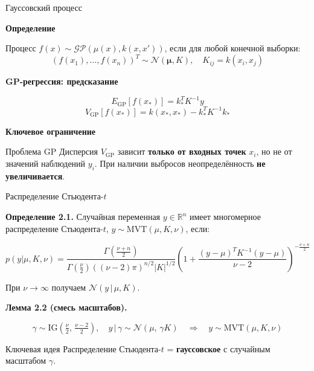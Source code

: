 \documentclass{beamer}
\begin{document}
\begin{frame}{Гауссовский процесс}

{\small
\textbf{Определение}

Процесс $f(x) \sim \mathcal{GP}(\mu(x), k(x,x'))$, если для любой конечной выборки:
\[
    (f(x_1), \ldots, f(x_n))^T \sim \mathcal{N}(\boldsymbol{\mu}, K), \quad K_{ij} = k(x_i, x_j)
\]

\vspace{3pt}

\textbf{GP-регрессия: предсказание}

\[
    E_{\mathrm{GP}}[f(x_*)] = k_*^T K^{-1} y
\]
\[
    V_{\mathrm{GP}}[f(x_*)] = k(x_*,x_*) - k_*^T K^{-1} k_*
\]

\vspace{3pt}

\textbf{Ключевое ограничение}

\begin{block}{Проблема GP}
Дисперсия $V_{\mathrm{GP}}$ зависит \textbf{только от входных точек} $x_i$, но не от значений наблюдений $y_i$. При наличии выбросов неопределённость \textbf{не увеличивается}.
\end{block}
}

\end{frame}


\begin{frame}{Распределение Стьюдента-$t$}

{\small
\textbf{Определение 2.1.} Случайная переменная $y \in \mathbb{R}^n$ имеет многомерное распределение Стьюдента-$t$, $y \sim \mathrm{MVT}(\mu, K, \nu)$, если:

\[
p(y|\mu,K,\nu) = \frac{\Gamma\!\left(\frac{\nu+n}{2}\right)}{\Gamma\!\left(\frac{\nu}{2}\right)\!\left((\nu-2)\pi\right)^{n/2}|K|^{1/2}}
\left(1 + \frac{(y-\mu)^T K^{-1}(y-\mu)}{\nu-2}\right)^{-\frac{\nu+n}{2}}
\]

При $\nu \to \infty$ получаем $\mathcal{N}(y\,|\,\mu, K)$.

\vspace{5pt}

\textbf{Лемма 2.2 (смесь масштабов).}

\[
    \gamma \sim \mathrm{IG}\!\left(\tfrac{\nu}{2},\, \tfrac{\nu-2}{2}\right), \quad
    y\,|\,\gamma \sim \mathcal{N}(\mu,\, \gamma K)
    \quad \Longrightarrow \quad
    y \sim \mathrm{MVT}(\mu, K, \nu)
\]

\begin{block}{Ключевая идея}
Распределение Стьюдента-$t$ = \textbf{гауссовское} с случайным масштабом $\gamma$.
\end{block}
}

\end{frame}
\end{document}
